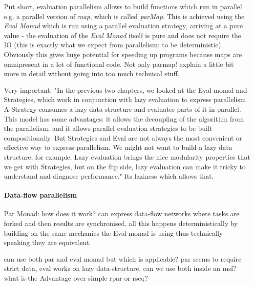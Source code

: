 Put short, evaluation parallelism allows to build functions which run in parallel e.g. a parallel version of \textit{map}, which is called \textit{parMap}. This is achieved using the \textit{Eval Monad} which is run using a parallel evaluation strategy, arriving at a pure value - the evaluation of the \textit{Eval Monad} itself is pure and does not require the IO (this is exactly what we expect from parallelism: to be deterministic). Obviously this gives huge potential for speeding up programs because maps are omnipresent in a lot of functional code. Not only parmap! explain a little bit more in detail without going into too much technical stuff.


Very important: "In the previous two chapters, we looked at the Eval monad and Strategies, which work in conjunction with lazy evaluation to express parallelism. A Strategy consumes a lazy data structure and evaluates parts of it in parallel. This model has some advantages: it allows the decoupling of the algorithm from the parallelism, and it allows parallel evaluation strategies to be built compositionally. But Strategies and Eval are not always the most convenient or effective way to express parallelism. We might not want to build a lazy data structure, for example. Lazy evaluation brings the nice modularity properties that we get with Strategies, but on the flip side, lazy evaluation can make it tricky to understand and diagnose performance."
Its laziness which allows that.



\paragraph{Data-flow parallelism}
Par Monad: how does it work? can express data-flow networks where tasks are forked and then results are synchronised. all this happens deterministically by building on the same mechanics the Eval monad is using thus technically speaking they are equivalent. 

can use both par and eval monad but which is applicable? par seems to require strict data, eval works on lazy data-structure. can we use both inside an msf? what is the Advantage over simple rpar or rseq?\\


